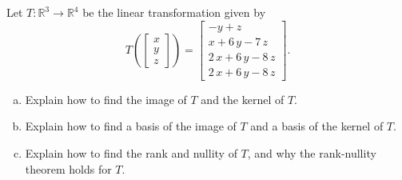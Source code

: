 
\begin{exerciseStatement}
 Let \(T:\mathbb{R}^ 3  \to \mathbb{R}^ 4 \) be the linear transformation given by \[T\left(  \left[\begin{array}{c}
x \\
y \\
z
\end{array}\right]  \right) =  \left[\begin{array}{c}
-y + z \\
x + 6 \, y - 7 \, z \\
2 \, x + 6 \, y - 8 \, z \\
2 \, x + 6 \, y - 8 \, z
\end{array}\right] .\]
\begin{enumerate}[(a)]
\item Explain how to find the image of \(T\) and the kernel of \(T\).
\item Explain how to find a basis of the image of \(T\) and a basis of the kernel of \(T\).
\item Explain how to find the rank and nullity of \(T\), and why the rank-nullity theorem holds for \(T\).
\end{enumerate}
    
\end{exerciseStatement}
    

